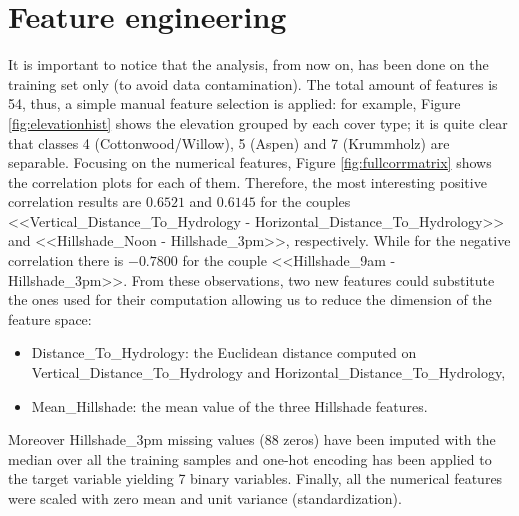 \section{Feature engineering}
\label{sec:feat_eng}
It is important to notice that the analysis, from now on, has been done on the training set only (to avoid data contamination). The total amount of features is 54, thus, a simple manual feature selection is applied: for example, Figure \ref{fig:elevationhist} shows the elevation grouped by each cover type; it is quite clear that classes 4 (Cottonwood/Willow), 5 (Aspen) and 7 (Krummholz) are separable. Focusing on the numerical features, Figure \ref{fig:fullcorrmatrix} shows the correlation plots for each of them. Therefore, the most interesting positive correlation results are $0.6521$ and $0.6145$ for the couples <<Vertical\_Distance\_To\_Hydrology - Horizontal\_Distance\_To\_Hydrology>> and <<Hillshade\_Noon - Hillshade\_3pm>>, respectively. While for the negative correlation there is $-0.7800$ for the couple <<Hillshade\_9am - Hillshade\_3pm>>. From these observations, two new features could substitute the ones used for their computation allowing us to reduce the dimension of the feature space:
\begin{itemize}
\item Distance\_To\_Hydrology: the Euclidean distance computed on Vertical\_Distance\_To\_Hydrology and Horizontal\_Distance\_To\_Hydrology,
\item Mean\_Hillshade: the mean value of the three Hillshade features.
\end{itemize}
Moreover Hillshade\_3pm missing values ($88$ zeros) have been imputed with the median over all the training samples and one-hot encoding has been applied to the target variable yielding 7 binary variables. Finally, all the numerical features were scaled with zero mean and unit variance (standardization).
